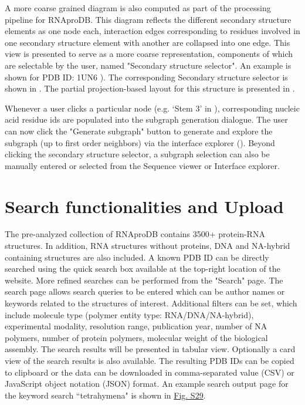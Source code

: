 A more coarse grained diagram is also computed as part of the processing pipeline for RNAproDB. This diagram reflects the different secondary structure elements as one node each, interaction edges corresponding to residues involved in one secondary structure element with another are collapsed into one edge. This view is presented to serve as a more coarse representation, components of which are selectable by the user, named "Secondary structure selector". An example is shown for PDB ID: 1UN6 ). The corresponding Secondary structure selector is shown in . The partial projection-based layout for this structure is presented in . 

Whenever a user clicks a particular node (e.g. `Stem 3' in ), corresponding nucleic acid residue ids are populated into the subgraph generation dialogue. The user can now click the "Generate subgraph" button to generate and explore the subgraph (up to first order neighbors) via the interface explorer (). Beyond clicking the secondary structure selector, a subgraph selection can also be manually entered or selected from the Sequence viewer or Interface explorer. 

\section{Search functionalities and Upload}

The pre-analyzed collection of RNAproDB contains 3500+ protein-RNA structures. In addition, RNA structures without proteins, DNA and NA-hybrid containing structures are also included. A known PDB ID can be directly searched using the quick search box available at the top-right location of the website. More refined searches can be performed from the "Search" page. The search page allows search queries to be entered which can be author names or keywords related to the structures of interest. Additional filters can be set, which include molecule type (polymer entity type: RNA/DNA/NA-hybrid), experimental modality, resolution range, publication year, number of NA polymers, number of protein polymers, molecular weight of the biological assembly. The search results will be presented in tabular view. Optionally a card view of the search results is also available. The resulting PDB IDs can be copied to clipboard or the data can be downloaded in comma-separated value (CSV) or JavaScript object notation (JSON) format. An example search output page for the keyword search ``tetrahymena" is shown in \hyperref[fig:rnaprodbS1]{Fig. S29}.

